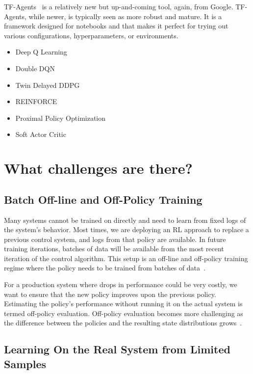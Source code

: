 \documentclass[letterpaper, 10 pt]{IEEEconf}
\begin{document}
TF-Agents~\cite{TFAgents} is a relatively new but up-and-coming tool, again, from
Google.  TF-Agents, while newer, is typically seen as more robust and
mature. It is a framework designed for notebooks and that makes it
perfect for trying out various configurations, hyperparameters, or
environments. 

\begin{itemize}
\item Deep Q Learning
\item Double DQN
\item Twin Delayed DDPG
\item REINFORCE
\item Proximal Policy Optimization
\item Soft Actor Critic
\end{itemize}

\section{What challenges are there?}

\subsection{Batch Off-line and Off-Policy Training}

Many systems cannot be trained on directly and need to learn from
fixed logs of the system’s behavior. Most times, we are deploying an
RL approach to replace a previous control system, and logs from that
policy are available. In future training iterations, batches of data
will be available from the most recent iteration of the control
algorithm. This setup is an off-line and off-policy training regime
where the policy needs to be trained from batches of data~\cite{deepmind2019}.

For a production system where drops in performance could be very
costly, we want to ensure that the new policy improves upon the
previous policy. Estimating the policy’s performance without running
it on the actual system is termed off-policy evaluation. Off-policy
evaluation becomes more challenging as the difference between the
policies and the resulting state distributions grows~\cite{deepmind2019}.

\subsection{Learning On the Real System from Limited Samples}
\end{document}
